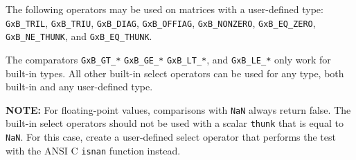 \documentclass[12pt]{article}
\begin{document}
The following operators may be used on matrices with a user-defined type:
\verb'GxB_TRIL',
\verb'GxB_TRIU',
\verb'GxB_DIAG',
\verb'GxB_OFFIAG',
\verb'GxB_NONZERO',
\verb'GxB_EQ_ZERO',
\verb'GxB_NE_THUNK',
and
\verb'GxB_EQ_THUNK'.

The comparators \verb'GxB_GT_*' \verb'GxB_GE_*' \verb'GxB_LT_*', and
\verb'GxB_LE_*' only work for built-in types.  All other built-in select
operators can be used for any type, both built-in and any user-defined type.

{\bf NOTE:} For floating-point values, comparisons with \verb'NaN' always return
false.  The built-in select operators should not be used with a scalar
\verb'thunk' that is equal to \verb'NaN'.  For this case, create a user-defined
select operator that performs the test with the ANSI C \verb'isnan' function
instead.
\end{document}
